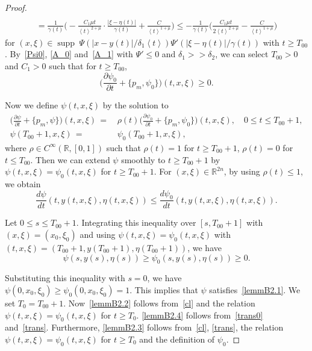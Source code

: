 \documentclass[10pt]{amsart}
\theoremstyle{definition}
\renewcommand*\c{\gamma}
\renewcommand*\d{\delta}
\newcommand*\g{\psi}
\newcommand*\m{\mu}
\newcommand*\x{\xi}
\newcommand*\y{\eta}
\newcommand{\G}{\Psi}
\newcommand*\re{\mathbb{R}}
\newcommand*\pa{\partial}
\DeclareMathOperator{\supp}{supp\;}
\newcommand{\jap}[1]{\left\langle #1 \right\rangle}
\newcommand{\biggpare}[1]{\biggl(#1\biggr)}
\begin{document}
\begin{proof}
\begin{multline}
\\
 =\frac{1}{\c(t)}\biggpare{-\frac{C_1\m t}{\jap{t}^{2+\m}}\cdot \frac{|\x-\y(t)|}{\c(t)}+\frac{C}{\jap{t}^{1+\m}}}
\leq-\frac{1}{\c(t)}\biggpare{\frac{C_1\m t}{2\jap{t}^{2+\m}}-\frac{C}{\jap{t}^{1+\m}}}
\end{multline}
for $(x,\x)\in \supp \Psi(|x-y(t)|/\d_1\jap{t})\Psi'(|\x-\y(t)|/\c(t))$ with $t\geq T_{00}$. By~\eqref{Psi0}, \eqref{A_0} and~\eqref{A_1} with $\G'\leq 0$ and $\d_1>>\d_2$, we can select $T_{00}>0$ and $C_1>0$ such that for $t\geq T_{00}$,
\begin{equation}\label{trans0}
\biggpare{\frac{\pa \g_0}{\pa t} + \{p_m, \g_0 \}}(t, x,\x)\geq 0.
\end{equation}

Now we define $\g(t,x,\x)$ by the solution to
\begin{equation}\label{trans}
\begin{aligned}
\biggpare{\frac{\pa \g}{\pa t} + \{p_m, \g \}}(t, x,\x)\,=\,& \rho(t)\biggpare{\frac{\pa \g_0}{\pa t} + \{p_m, \g_0 \}}(t, x,\x), \quad 0\leq t\leq T_{00}+1,
\\
\g(T_{00}+1,x,\x)\,=\,& \g_0(T_{00}+1, x, \x),
\end{aligned}
\end{equation}
where $\rho \in C^{\infty}(\re, [0,1])$ such that $\rho(t)=1$ for $t\geq T_{00}+1$, $\rho(t) = 0$ for $t\leq T_{00}$. Then we can extend $\g$ smoothly to $t\geq T_{00} + 1$ by $ \g(t,x,\x) = \g_0(t, x, \x)$ for $t \geq T_{00}+1$. For $(x,\x)\in \re^{2n}$, by using $\rho(t)\leq 1$, we obtain
\[
\frac{d\g}{dt}(t,y(t,x,\x),\y(t,x,\x))\leq \frac{d\g_0}{dt}(t,y(t,x,\x),\y(t,x,\x)).
\]


Let $0\leq s\leq T_{00}+1$. Integrating this inequality over $[s,T_{00}+1]$ with $(x,\x)=(x_0,\x_0)$ and using $ \g(t,x,\x) = \g_0(t, x, \x)$ with $(t, x,\x)=(T_{00}+1, y(T_{00}+1), \y(T_{00}+1))$, we have
\[
\g(s,y(s),\y(s)) \geq \g_0(s,y(s),\y(s))\geq 0.
\]


Substituting this inequality with $s=0$, we have $\g(0,x_0,\x_0)\geq \g_0(0,x_0,\x_0)=1$. This implies that $\g$ satisfies~\eqref{lemmB2.1}. We set $T_0=T_{00}+1$. Now~\eqref{lemmB2.2} follows from~\eqref{cl} and the relation $\g(t,x,\x)=\g_0(t,x,\x)$ for $t\geq T_0$. \eqref{lemmB2.4} follows from~\eqref{trans0} and~\eqref{trans}. Furthermore, \eqref{lemmB2.3} follows from~\eqref{cl}, \eqref{trans}, the relation $\g(t,x,\x)=\g_0(t,x,\x)$ for $t\geq T_0$ and the definition of $\g_0$.
\end{proof}
\end{document}
